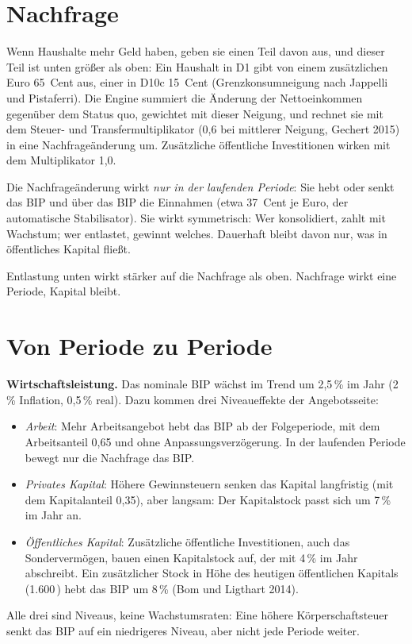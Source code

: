 \section{Nachfrage}

Wenn Haushalte mehr Geld haben, geben sie einen Teil davon aus, und dieser Teil ist unten
größer als oben: Ein Haushalt in D1 gibt von einem zusätzlichen Euro 65~Cent aus, einer in
D10c 15~Cent (Grenzkonsumneigung nach Jappelli und Pistaferri). Die Engine summiert die
Änderung der Nettoeinkommen gegenüber dem Status quo, gewichtet mit dieser Neigung, und
rechnet sie mit dem Steuer- und Transfermultiplikator (0,6 bei mittlerer Neigung, Gechert
2015) in eine Nachfrageänderung um. Zusätzliche öffentliche Investitionen wirken mit dem
Multiplikator 1,0.

Die Nachfrageänderung wirkt \emph{nur in der laufenden Periode}: Sie hebt oder senkt das BIP
und über das BIP die Einnahmen (etwa 37~Cent je Euro, der automatische Stabilisator). Sie
wirkt symmetrisch: Wer konsolidiert, zahlt mit Wachstum; wer entlastet, gewinnt welches.
Dauerhaft bleibt davon nur, was in öffentliches Kapital fließt.

\begin{merksatz}
Entlastung unten wirkt stärker auf die Nachfrage als oben. Nachfrage wirkt eine Periode,
Kapital bleibt.
\end{merksatz}

\section{Von Periode zu Periode}

\textbf{Wirtschaftsleistung.} Das nominale BIP wächst im Trend um 2,5\,\% im Jahr (2\,\%
Inflation, 0,5\,\% real). Dazu kommen drei Niveaueffekte der Angebotsseite:
\begin{itemize}
\item \emph{Arbeit}: Mehr Arbeitsangebot hebt das BIP ab der Folgeperiode, mit dem
  Arbeitsanteil 0,65 und ohne Anpassungsverzögerung. In der laufenden Periode bewegt nur die
  Nachfrage das BIP.
\item \emph{Privates Kapital}: Höhere Gewinnsteuern senken das Kapital langfristig (mit dem
  Kapitalanteil 0,35), aber langsam: Der Kapitalstock passt sich um 7\,\% im Jahr an.
\item \emph{Öffentliches Kapital}: Zusätzliche öffentliche Investitionen, auch das
  Sondervermögen, bauen einen Kapitalstock auf, der mit 4\,\% im Jahr abschreibt. Ein
  zusätzlicher Stock in Höhe des heutigen öffentlichen Kapitals (1.600\,\Mrd) hebt das BIP um
  8\,\% (Bom und Ligthart 2014).
\end{itemize}
Alle drei sind Niveaus, keine Wachstumsraten: Eine höhere Körperschaftsteuer senkt das BIP
auf ein niedrigeres Niveau, aber nicht jede Periode weiter.

